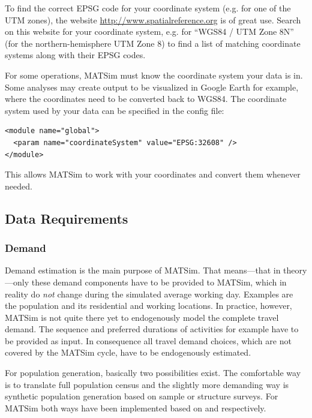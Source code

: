 To find the correct EPSG code for your coordinate system (e.g. for one of the UTM zones), the website \url{http://www.spatialreference.org} is of great use. Search on this website for your coordinate system, e.g. for ``WGS84 / UTM Zone 8N'' (for the northern-hemisphere UTM Zone 8) to find a list of matching coordinate systems along with their EPSG codes.

For some operations, MATSim must know the coordinate system your data is in. Some analyses may create output to be visualized in Google Earth for example, where the coordinates need to be converted back to WGS84. The coordinate system used by your data can be specified in the config file:

\begin{lstlisting}
<module name="global"> 
  <param name="coordinateSystem" value="EPSG:32608" /> 
</module>
\end{lstlisting}

This allows MATSim to work with your coordinates and convert them whenever needed. 

\subsection{Data Requirements}
\subsubsection{Demand}
Demand estimation is the main purpose of MATSim. That means---that in theory---only these demand components have to be provided to MATSim, which in reality do \emph{not} change during the simulated average working day. Examples are the population and its residential and working locations. In practice, however, MATSim is not quite there yet to endogenously model the complete travel demand. The sequence and preferred durations of activities for example have to be provided as input. In consequence all travel demand choices, which are not covered by the MATSim cycle, have to be endogenously estimated. 

For population generation, basically two possibilities exist. The comfortable way is to translate full population census and the slightly more demanding way is synthetic population generation \citep[e.g.,][]{} based on sample or structure surveys. For MATSim both ways have been implemented based on \citet[][]{BfS_VZ_2000} and \citet[][]{Mueller_unpub_STRC_2011} respectively.

